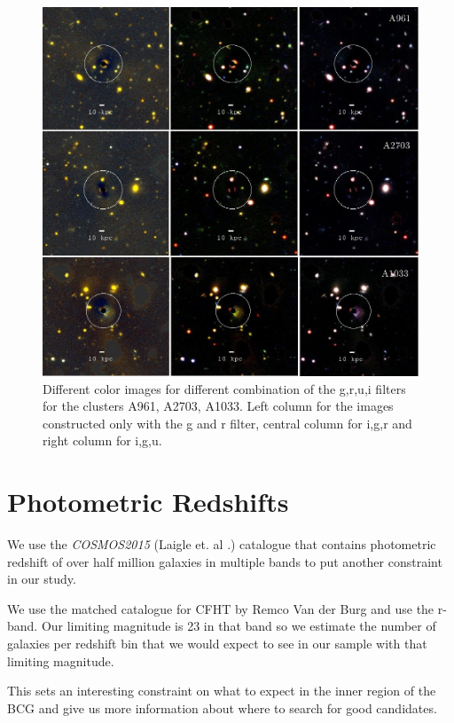 \begin{figure}[H]
\centering
\includegraphics[width=15cm]{images/full_small.jpg}
\caption[Color images for various clusters]{Different color images for different combination of the g,r,u,i filters for the clusters A961, A2703, A1033. Left column for the images constructed only with the g and r filter, central column for i,g,r and right column for i,g,u.}
\end{figure}

\section{Photometric Redshifts}

We use the \textit{COSMOS2015} (Laigle et. al \citeyear{Reference21}.) catalogue that contains photometric redshift of over half million galaxies in multiple bands to put another constraint in our study.

We use the matched catalogue for CFHT by Remco Van der Burg and use the r-band. Our limiting magnitude is 23 in that band so we estimate the number of galaxies per redshift bin that we would expect to see in our sample with that limiting magnitude.

This sets an interesting constraint on what to expect in the inner region of the BCG and give us more information about where to search for good candidates.


